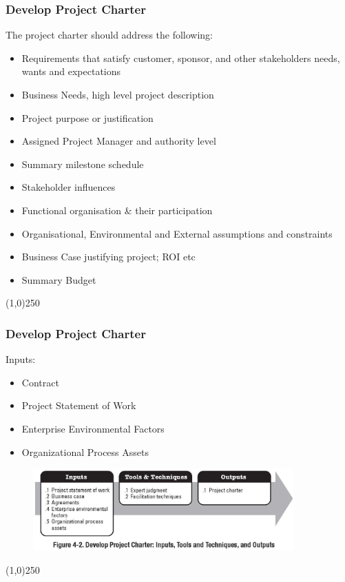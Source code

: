 \begin{frame}
\frametitle{Develop Project Charter}
The project charter should address the following:
\begin{itemize}
	\item Requirements that satisfy customer, sponsor, and other stakeholders needs, wants and expectations
	\item Business Needs, high level project description
	\item Project purpose or justification
	\item Assigned Project Manager and authority level
	\item Summary milestone schedule
	\item Stakeholder influences
	\item Functional organisation \& their participation
	\item Organisational, Environmental and External assumptions and constraints
	\item Business Case justifying project; ROI etc
	\item Summary Budget
\end{itemize}
\end{frame}\begin{center}\line(1,0){250}\end{center}
%
%


\begin{frame}
\frametitle{Develop Project Charter} 
Inputs:
\begin{itemize}
	\item Contract
	\item Project Statement of Work
	\item Enterprise Environmental Factors
	\item Organizational Process Assets
\end{itemize}
\begin{figure}
	\centering
 		\includegraphics[width = 10cm]{images/Fig4-2.jpg}
 	\label{fig:4-2}
 \end{figure}
\end{frame}\begin{center}\line(1,0){250}\end{center}
%
%

